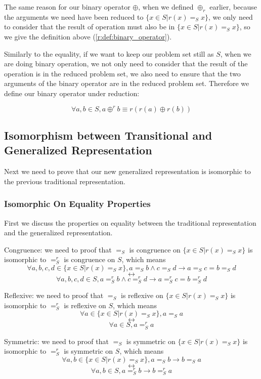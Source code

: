 \documentclass[a4paper,10pt]{article}
\newcommand{\e}[2]{
\begin{equation}
  \label{#1} 
  #2
\end{equation}
}
\begin{document}
The same reason for our binary operator $\oplus$, when we defined $\oplus_r$ earlier, because the arguments we need have been reduced to $\{x \in S | r(x) =_S x \}$, we only need to consider that the result of operation must also be in $\{x \in S | r(x) =_S x\}$, so we give the definition above (\ref{r:def:binary_operator}).

Similarly to the equality, if we want to keep our problem set still as $S$, when we are doing binary operation, we not only need to consider that the result of the operation is in the reduced problem set, we also need to ensure that the two arguments of the binary operator are in the reduced problem set. Therefore we define our binary operator under reduction:
\e{gr:def:binary_operator}{\forall a,b \in S, a \oplus^r b \equiv r(r(a) \oplus r(b))}

\subsection{Isomorphism between Transitional and Generalized Representation}
Next we need to prove that our new generalized representation is isomorphic to the previous traditional representation.

\subsubsection{Isomorphic On Equality Properties}
First we discuss the properties on equality between the traditional representation and the generalized representation.

Congruence: we need to proof that $=_S$ is congruence on $\{x \in S | r(x) =_S x\}$ is isomorphic to $=^r_S$ is congruence on $S$, which means 
\[\forall a,b,c,d \in \{x \in S | r(x) =_S x \}, a =_S b \wedge c =_S d \rightarrow a =_S c = b =_S d \]
\[\longleftrightarrow \]
\[\forall a,b,c,d \in S, a =^r_S b \wedge c =^r_S d \rightarrow a =^r_S c = b =^r_S d
\]

Reflexive: we need to proof that $=_S$ is reflexive on $\{x \in S | r(x) =_S x \}$ is isomorphic to $=^r_S$ is reflexive on $S$, which means 
\[\forall a \in \{x \in S | r(x) =_S x \}, a =_S a \]
\[\longleftrightarrow \]
\[\forall a \in S, a =^r_S a
\]

Symmetric: we need to proof that $=_S$ is symmetric on $\{x \in S | r(x) =_S x\}$ is isomorphic to $=^r_S$ is symmetric on $S$, which means 
\[\forall a,b \in \{x \in S | r(x) =_S x \}, a =_S b \rightarrow b =_S a \]
\[\longleftrightarrow \]
\[\forall a,b \in S, a =^r_S b \rightarrow b =^r_S a
\]
\end{document}
